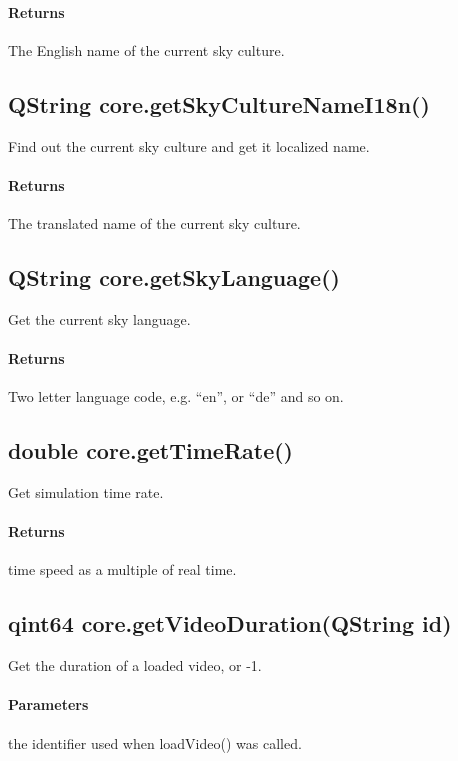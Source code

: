 \paragraph{Returns}
The English name of the current sky culture.

\subsection{QString core.getSkyCultureNameI18n()}
\label{sec:ScriptingAPI:core:getSkyCultureNameI18n}
Find out the current sky culture and get it localized name.

\paragraph{Returns}
The translated name of the current sky culture.

\subsection{QString core.getSkyLanguage()}
\label{sec:ScriptingAPI:core:getSkyLanguage}
Get the current sky language.

\paragraph{Returns}
Two letter language code, e.g. ``en'', or ``de'' and so on.

\subsection{double core.getTimeRate()}
\label{sec:ScriptingAPI:core:getTimeRate}
Get simulation time rate.

\paragraph{Returns}
time speed as a multiple of real time.

\subsection{qint64 core.getVideoDuration(QString id)}
\label{sec:ScriptingAPI:core:getVideoDuration}
Get the duration of a loaded video, or -1.

\paragraph{Parameters}
\begin{description}[align=right,labelwidth=3cm,leftmargin=3.2cm]
\item[\parameter{id}] the identifier used when loadVideo() was called.
\end{description}

